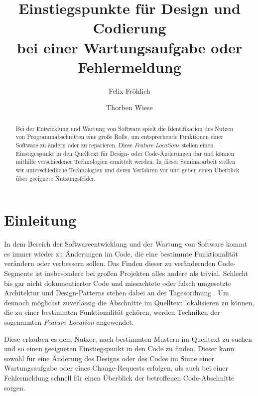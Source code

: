 \documentclass[runningheads,a4paper]{llncs}
\begin{document}
\title{Einstiegspunkte für Design und Codierung \\bei einer Wartungsaufgabe oder Fehlermeldung}


\author{Felix Fröhlich \and Thorben Wiese}



\maketitle

\begin{abstract}
Bei der Entwicklung und Wartung von Software spielt die Identifikation des Nutzen von Programmabschnitten eine große Rolle, um entsprechende Funktionen einer Software zu ändern oder zu reparieren. Diese \textit{Feature Locations} stellen einen Einstigespunkt in den Quelltext für Design- oder Code-Änderungen dar und können mithilfe verschiedener Technologien ermittelt werden. In dieser Seminararbeit stellen wir unterschiedliche Technologien und deren Verfahren vor und geben einen Überblick über geeignete Nutzungsfelder.
\end{abstract}

\section{Einleitung}

In dem Bereich der Softwareentwicklung und der Wartung von Software kommt es immer wieder zu Änderungen im Code, die eine bestimmte Funktionalität verändern oder verbessern sollen. Das Finden dieser zu verändernden Code-Segmente ist insbesondere bei großen Projekten alles andere als trivial. Schlecht bis gar nicht dokumentierter Code und missachtete oder falsch umgesetzte Architektur und Design-Patterns stehen dabei an der Tagesordnung \cite{survey}. Um dennoch möglichst zuverlässig die Abschnitte im Quelltext lokalisieren zu können, die zu einer bestimmten Funktionalität gehören, werden Techniken der sogenannten \textit{Feature Location} angewendet.

Diese erlauben es dem Nutzer, nach bestimmten Mustern im Quelltext zu suchen und so einen geeigneten Einstiegspunkt in den Code zu finden. Dieser kann sowohl für eine Änderung des Designs oder des Codes im Sinne einer Wartungsaufgabe oder eines Change-Requests erfolgen, als auch bei einer Fehlermeldung schnell für einen Überblick der betroffenen Code-Abschnitte sorgen.
\end{document}
